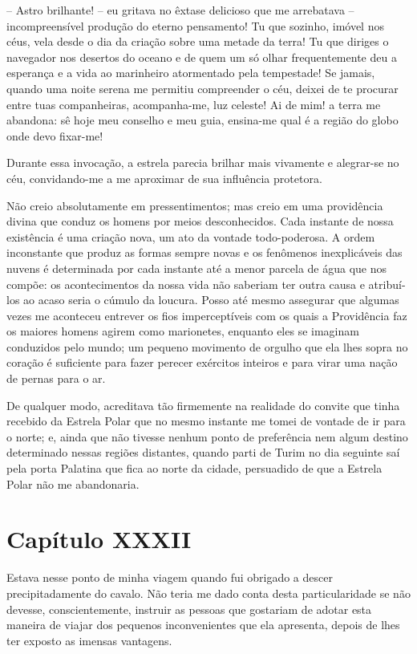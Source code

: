  -- Astro brilhante! -- eu gritava no êxtase delicioso que me arrebatava -- 
incompreensível produção do eterno pensamento! Tu que sozinho, imóvel
nos céus, vela desde o dia da criação sobre uma metade da terra! Tu que
diriges o navegador nos desertos do oceano e de quem um só olhar
frequentemente deu a esperança e a vida ao marinheiro atormentado pela
tempestade! Se jamais, quando uma noite serena me permitiu compreender
o céu, deixei de te procurar entre tuas companheiras, acompanha-me, luz
celeste! Ai de mim! a terra me abandona: sê hoje meu conselho e meu
guia, ensina-me qual é a região do globo onde devo fixar-me!

 Durante essa invocação, a estrela parecia brilhar mais vivamente e
alegrar-se no céu, convidando-me a me aproximar de sua influência
protetora.

 Não creio absolutamente em pressentimentos; mas creio em uma
providência divina que conduz os homens por meios desconhecidos. Cada
instante de nossa existência é uma criação nova, um ato da vontade
todo-poderosa. A ordem inconstante que produz as formas sempre novas e
os fenômenos inexplicáveis das nuvens é determinada por cada instante
até a menor parcela de água que nos compõe: os acontecimentos da nossa
vida não saberiam ter outra causa e atribuí-los ao acaso seria o cúmulo
da loucura. Posso até mesmo assegurar que algumas vezes me aconteceu
entrever os fios imperceptíveis com os quais a Providência faz os
maiores homens agirem como marionetes, enquanto eles se imaginam
conduzidos pelo mundo; um pequeno movimento de orgulho que ela lhes
sopra no coração é suficiente para fazer perecer exércitos inteiros e
para virar uma nação de pernas para o ar. 

 De qualquer modo, acreditava tão firmemente na realidade do convite que
tinha recebido da Estrela Polar que no mesmo instante me tomei de
vontade de ir para o norte; e, ainda que não tivesse nenhum ponto de
preferência nem algum destino determinado nessas regiões distantes,
quando parti de Turim no dia seguinte saí pela porta Palatina que fica
ao norte da cidade, persuadido de que a Estrela Polar não me
abandonaria. 

\section{Capítulo XXXII}

 Estava nesse ponto de minha viagem quando fui obrigado a descer
precipitadamente do cavalo. Não teria me dado conta desta
particularidade se não devesse, conscientemente, instruir as pessoas
que gostariam de adotar esta maneira de viajar dos pequenos
inconvenientes que ela apresenta, depois de lhes ter exposto as
imensas vantagens.

